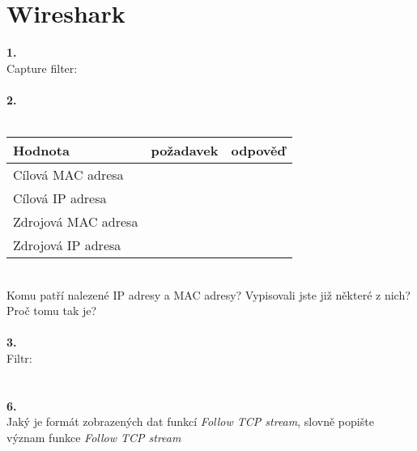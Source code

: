\section{Wireshark}
\textbf{1.}\\
Capture filter:\\
\\
\textbf{2.}\\
\\
\begin{tabular}{|l|c|c|}
\hline
\textbf{Hodnota} & \textbf{požadavek} & \textbf{odpověď}\\
\hline
Cílová MAC adresa & \hspace{10em} & \hspace{10em} \\
\hline
Cílová IP adresa & & \\
\hline
Zdrojová MAC adresa & & \\
\hline
Zdrojová IP adresa & & \\
\hline
\end{tabular}
\vspace{2em}
\\
Komu patří nalezené IP adresy a MAC adresy? Vypisovali jste již některé z nich? Proč tomu tak je?
\\
\vspace{6em} \\
\textbf{3.}\\
Filtr:\\
\\
\vspace{2em} \\
\textbf{6.}\\
Jaký je formát zobrazených dat funkcí \emph{Follow TCP stream}, slovně popište
význam funkce \emph{Follow TCP stream}\\
